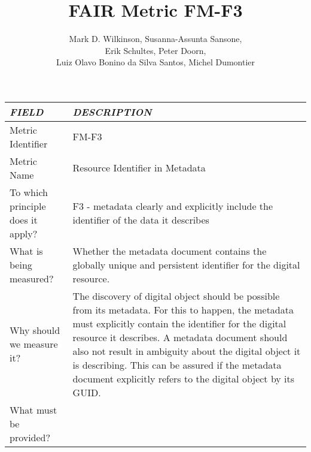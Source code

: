 \documentclass[english]{article}
\begin{document}
\title{FAIR Metric FM-F3}

\author{Mark D. Wilkinson, Susanna-Assunta Sansone, \\Erik Schultes, Peter Doorn,\\ 
Luiz Olavo Bonino da Silva Santos, Michel Dumontier}

\maketitle

\newpage





\begin{longtable}{|p{5cm}|p{9cm}|}


\hline
\emph{FIELD} & \emph{DESCRIPTION} \\
\hline
Metric Identifier &   FM-F3
 \\


\hline
Metric Name &   

Resource Identifier in Metadata


 \\



\hline
To which principle does it apply? &   
F3 - metadata clearly and explicitly include the identifier of the data it describes
\\



\hline
What is being measured? & 


Whether the metadata document contains the globally unique and persistent identifier for the digital resource.

\\



\hline
Why should we measure it? & 



The discovery of digital object should be possible from its metadata. For this to happen, the metadata must explicitly contain the identifier for the digital resource it describes. 
A metadata document should also not result in ambiguity about the digital object it is describing. This can be assured if the metadata document explicitly refers to the digital object by its GUID.

  
\\



\hline
What must be provided? &  



\end{longtable}
\end{document}
